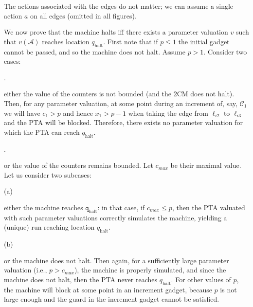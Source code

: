  
The actions associated with the edges do not matter; we can assume a single action $a$ on all edges (omitted in all figures).\par
 
 
 
We now prove that the machine halts iff there exists a parameter valuation $v$ such that $v(\mathcal{A})$ reaches location $q_{\textrm{halt}}$. First note that if $p\leq 1$ the initial gadget cannot be passed, and so the machine does not halt. Assume $p>1$. Consider two cases:\par
  
\par{}. 
 
either the value of the counters is not bounded (and the 2CM does not halt). Then, for any parameter valuation, at some point during an increment of, say, $\mathcal{C}_{1}$ we will have $c_{1}>p$ and hence $x_{1}>p-1$ when taking the edge from $\mathrm{\mathrm{\ell}}_{i2}$ to $\mathrm{\mathrm{\ell}}_{i3}$ and the PTA will be blocked. Therefore, there exists no parameter valuation for which the PTA can reach $q_{\textrm{halt}}$.\par
 
 
 
\par{}. 
 
or the value of the counters remains bounded. Let $c_{\mathit{max}}$ be their maximal value. Let us consider two subcases:\par
  
\par\noindent  (a) 
 
either the machine reaches $\mathtt{q}_{\textrm{halt}}$: in that case, if $c_{\mathit{max}}\leq p$, then the PTA valuated with such parameter valuations correctly simulates the machine, yielding a (unique) run reaching location $q_{\textrm{halt}}$.\par
 
 
 
\par\noindent  (b) 
 
or the machine does not halt. Then again, for a sufficiently large parameter valuation (i.e., $p>c_{\mathit{max}}$), the machine is properly simulated, and since the machine does not halt, then the PTA never reaches $q_{\textrm{halt}}$. For other values of $p$, the machine will block at some point in an increment gadget, because $p$ is not large enough and the guard in the increment gadget cannot be satisfied.\par
 
